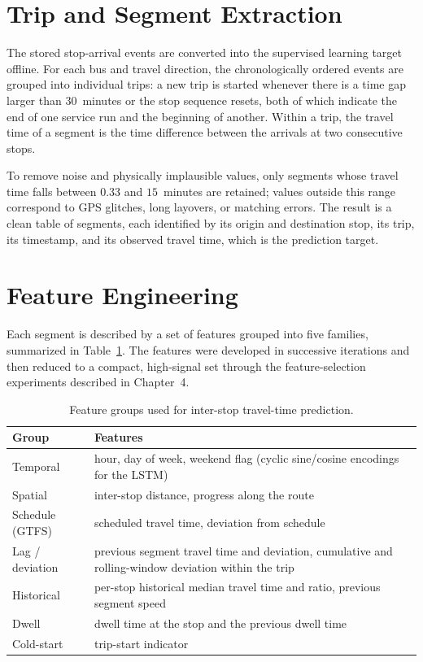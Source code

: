 \section{Trip and Segment Extraction}

The stored stop-arrival events are converted into the supervised learning target offline. For each bus and travel direction, the chronologically ordered events are grouped into individual trips: a new trip is started whenever there is a time gap larger than 30~minutes or the stop sequence resets, both of which indicate the end of one service run and the beginning of another. Within a trip, the travel time of a segment is the time difference between the arrivals at two consecutive stops.

To remove noise and physically implausible values, only segments whose travel time falls between $0.33$ and $15$~minutes are retained; values outside this range correspond to GPS glitches, long layovers, or matching errors. The result is a clean table of segments, each identified by its origin and destination stop, its trip, its timestamp, and its observed travel time, which is the prediction target.

\section{Feature Engineering}

Each segment is described by a set of features grouped into five families, summarized in Table~\ref{tab:features}. The features were developed in successive iterations and then reduced to a compact, high-signal set through the feature-selection experiments described in Chapter~4.

\begin{table}[!htbp]
    \centering
    \caption{\label{tab:features}Feature groups used for inter-stop travel-time prediction.}
    \begin{tabular}{@{}lp{8.2cm}@{}}
        \toprule
        \textbf{Group} & \textbf{Features} \\
        \midrule
        Temporal & hour, day of week, weekend flag (cyclic sine/cosine encodings for the LSTM) \\
        Spatial & inter-stop distance, progress along the route \\
        Schedule (GTFS) & scheduled travel time, deviation from schedule \\
        Lag / deviation & previous segment travel time and deviation, cumulative and rolling-window deviation within the trip \\
        Historical & per-stop historical median travel time and ratio, previous segment speed \\
        Dwell & dwell time at the stop and the previous dwell time \\
        Cold-start & trip-start indicator \\
        \bottomrule
    \end{tabular}
\end{table}

